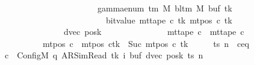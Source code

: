 \begin{isabellebody}
\ \ \ \ \ \ \ \ \ \ \ \ \ \ \ \ \ \ \ \ \ \ \ \ \ \ {\isacharparenleft}{\kern0pt}{}\ {\isacharasterisk}{\kern0pt}\ gamma{\isacharunderscore}{\kern0pt}enum\ {\isacharparenleft}{\kern0pt}{\isasymGamma}{\isacharunderscore}{\kern0pt}tm\ M{\isacharparenright}{\kern0pt}\ {\isacharparenleft}{\kern0pt}bl{\isacharunderscore}{\kern0pt}tm\ M{\isacharparenright}{\kern0pt}\ {\isacharparenleft}{\kern0pt}buf\ tk{\isacharparenright}{\kern0pt}\isanewline
\ \ \ \ \ \ \ \ \ \ \ \ \ \ \ \ \ \ \ \ \ \ \ \ \ \ \ \ \ {\isacharplus}{\kern0pt}\ bit{\isacharunderscore}{\kern0pt}value\ {\isacharparenleft}{\kern0pt}mt{\isacharunderscore}{\kern0pt}tape\ c{\isacharprime}{\kern0pt}\ tk\ {\isacharparenleft}{\kern0pt}mt{\isacharunderscore}{\kern0pt}pos\ c{\isacharprime}{\kern0pt}\ tk{\isacharparenright}{\kern0pt}{\isacharparenright}{\kern0pt}{\isacharparenright}{\kern0pt}{\isacharparenright}{\kern0pt}{\isacharcomma}{\kern0pt}\isanewline
\ \ \ \ \ \ \ \ \ \ \ \ \ \ \ \ \ \ \ \ dvec{\isacharcomma}{\kern0pt}\ posk{\isacharparenright}{\kern0pt}\isanewline
\ \ \ \ \ \ \ \ \ \ \ \ \ \ {\isasymand}\ mt{\isacharunderscore}{\kern0pt}tape\ c{\isacharprime}{\kern0pt}{\isacharprime}{\kern0pt}\ {\isacharequal}{\kern0pt}\ mt{\isacharunderscore}{\kern0pt}tape\ c{\isacharprime}{\kern0pt}\isanewline
\ \ \ \ \ \ \ \ \ \ \ \ \ \ {\isasymand}\ mt{\isacharunderscore}{\kern0pt}pos\ c{\isacharprime}{\kern0pt}{\isacharprime}{\kern0pt}\ {\isacharequal}{\kern0pt}\ {\isacharparenleft}{\kern0pt}mt{\isacharunderscore}{\kern0pt}pos\ c{\isacharprime}{\kern0pt}{\isacharparenright}{\kern0pt}{\isacharparenleft}{\kern0pt}tk\ {\isacharcolon}{\kern0pt}{\isacharequal}{\kern0pt}\ Suc\ {\isacharparenleft}{\kern0pt}mt{\isacharunderscore}{\kern0pt}pos\ c{\isacharprime}{\kern0pt}\ tk{\isacharparenright}{\kern0pt}{\isacharparenright}{\kern0pt}{\isachardoublequoteclose}\isanewline
%
\isadelimproof
%
\endisadelimproof
%
\isatagproof
{}\isamarkupfalse%
\ {\isacharminus}{\kern0pt}\isanewline
\ \ \isamarkupfalse%
\ ts\ n\ \ c{\isacharprime}{\kern0pt}{\isacharunderscore}{\kern0pt}eq{\isacharcolon}{\kern0pt}\isanewline
\ \ \ \ \ \ {\isachardoublequoteopen}c{\isacharprime}{\kern0pt}\ {\isacharequal}{\kern0pt}\ Config\isactrlsub M\ {\isacharparenleft}{\kern0pt}q{\isacharcomma}{\kern0pt}\ AR{\isacharunderscore}{\kern0pt}SimRead{\isacharcomma}{\kern0pt}\ tk{\isacharcomma}{\kern0pt}\ i{\isacharcomma}{\kern0pt}\ buf{\isacharcomma}{\kern0pt}\ dvec{\isacharcomma}{\kern0pt}\ posk{\isacharparenright}{\kern0pt}\ ts\ n{\isachardoublequoteclose}\isanewline
\ \ \ \ \isamarkupfalse%

\end{isabellebody}
